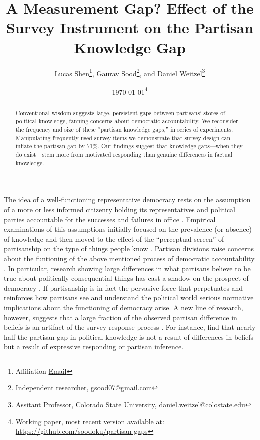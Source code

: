 \documentclass[12pt, letterpaper]{article}
\title{A Measurement Gap? Effect of the Survey Instrument on the Partisan Knowledge Gap}
\author{Lucas Shen\thanks{Affiliation \href{Email}{Email}},
  Gaurav Sood\thanks{Independent researcher, \href{gsood07@gmail.com}{gsood07@gmail.com}}, and
  Daniel Weitzel\thanks{Assitant Professor, Colorado State University, \href{mailto:daniel.weitzel@colostate.edu}{daniel.weitzel@colostate.edu}}}
\date{\today \thanks{Working paper, most recent version available at: \href{https://github.com/soodoku/partisan-gaps}{https://github.com/soodoku/partisan-gaps}}}
\begin{document}
\maketitle
\thispagestyle{empty}

\begin{abstract}

\noindent Conventional wisdom suggests large, persistent gaps between partisans' stores of political knowledge, fanning concerns about democratic accountability. We reconsider the frequency and size of these ``partisan knowledge gaps,'' in  series of experiments. Manipulating frequently used survey items we demonstrate that survey design can inflate the partisan gap by 71\%. Our findings suggest that knowledge gaps---when they do exist---stem more from motivated responding than genuine differences in factual knowledge.

\end{abstract}

\vspace{.2in}


\newpage

\doublespacing

The idea of a well-functioning representative democracy rests on the assumption of a more or less informed citizenry holding its representatives and political parties accountable for the successes and failures in office \citep{schattschneider-1960}. Empirical examinations of this assumptions initially focused on the prevalence (or absence) of knowledge \citep{dellicarpini} and then moved to the effect of the ``perceptual screen'' \citep[p. 133]{campbell1980american} of partisanship on the type of things people know \citep{bartels_2002}. Partisan divisions raise concerns about the funtioning of the above mentioned process of democratic accountability \citep{hochschild2015isn}. In particular, research showing large differences in what partisans believe to be true about politically consequential things has cast a shadow on the prospect of democracy \citep{campbell1980american, jerit2012partisan}. If partisanship is in fact the pervasive force that perpetuates and reinforces how partisans see and understand the political world \citep[p. 138]{bartels_2002} serious normative implications about the functioning of democracy arise. A new line of research, however, suggests that a large fraction of the observed partisan difference in beliefs is an artifact of the survey response process \citep{bullocketal_2015,huber_yair_2018, prior2015you}. For instance, \cite{bullocketal_2015} find that nearly half the partisan gap in political knowledge is not a result of differences in beliefs but a result of expressive responding or partisan inference.
\end{document}
